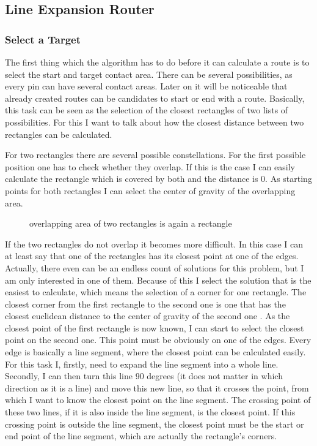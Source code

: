 \subsection{Line Expansion Router}

\subsubsection{Select a Target}
The first thing which the algorithm has to do before it can calculate a route is to select the start and target contact area. There can be several possibilities, as every pin can have several contact areas. Later on it will be noticeable that already created routes can be candidates to start or end with a route. Basically, this task can be seen as the selection of the closest rectangles of two lists of possibilities. For this I want to talk about how the closest distance between two rectangles can be calculated.

For two rectangles there are several possible constellations. For the first possible position one has to check whether they overlap. If this is the case I can easily calculate the rectangle which is covered by both  and the distance is 0. As starting points for both rectangles I can select the center of gravity of the overlapping area.

\begin{figure}
	\centering
	
  	\caption{overlapping area of two rectangles is again a rectangle}
	\label{fig:rectangles_overlapping}
\end{figure}

If the two rectangles do not overlap it becomes more difficult. In this case I can at least say that one of the rectangles has its closest point at one of the edges. Actually, there even can be an endless count of solutions for this problem, but I am only interested in one of them. Because of this I select the solution that is the easiest to calculate, which means the selection of a corner for one rectangle. The closest corner from the first rectangle to the second one is one that has the closest euclidean distance to the center of gravity of the second one . As the closest point of the first rectangle is now known, I can start to select the closest point on the second one. This point must be obviously on one of the edges. Every edge is basically a line segment, where the closest point can be calculated easily. For this task I, firstly, need to expand the line segment into a whole line. Secondly, I can then turn this line 90 degrees (it does not matter in which direction as it is a line) and move this new line, so that it crosses the point, from which I want to know the closest point on the line segment. The crossing point of these two lines, if it is also inside the line segment, is the closest point. If this crossing point is outside the line segment, the closest point must be the start or end point of the line segment, which are actually the rectangle's corners.

